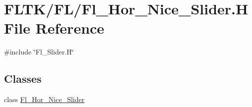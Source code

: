 \hypertarget{_fl___hor___nice___slider_8_h}{}\section{F\+L\+T\+K/\+F\+L/\+Fl\+\_\+\+Hor\+\_\+\+Nice\+\_\+\+Slider.H File Reference}
\label{_fl___hor___nice___slider_8_h}
{\ttfamily \#include \char`\"{}Fl\+\_\+\+Slider.\+H\char`\"{}}\newline
\subsection*{Classes}
\begin{DoxyCompactItemize}
\item 
class \hyperlink{class_fl___hor___nice___slider}{Fl\+\_\+\+Hor\+\_\+\+Nice\+\_\+\+Slider}
\end{DoxyCompactItemize}
